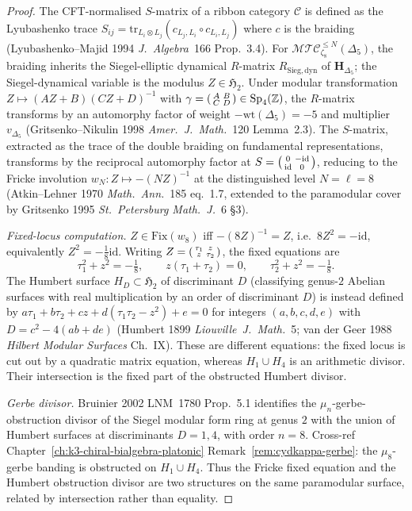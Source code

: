 \begin{proof}
The CFT-normalised $S$-matrix of a ribbon category $\mathcal C$ is
defined as the Lyubashenko trace
$S_{ij} = \mathrm{tr}_{L_i\otimes L_j}(c_{L_j,L_i}\circ c_{L_i,L_j})$
where $c$ is the braiding (Lyubashenko--Majid 1994 \emph{J.~Algebra}~166
Prop.~3.4). For \(\mathcal{MTC}_{\zeta_8}^{\leq N}(\Delta_5)\), the braiding
inherits the Siegel-elliptic dynamical $R$-matrix $R_{\mathrm{Sieg,dyn}}$
of $\mathbf H_{\Delta_5}$; the Siegel-dynamical variable is the modulus
$Z\in\mathfrak H_2$. Under modular transformation
$Z\mapsto (AZ+B)(CZ+D)^{-1}$ with $\gamma=\begin{psmallmatrix}A&B\\C&D\end{psmallmatrix}
\in\mathrm{Sp}_4(\mathbb Z)$, the $R$-matrix transforms by an
automorphy factor of weight $-\mathrm{wt}(\Delta_5) = -5$ and
multiplier $v_{\Delta_5}$
(Gritsenko--Nikulin 1998 \emph{Amer.~J.~Math.}~120 Lemma~2.3). The
$S$-matrix, extracted as the trace of the double braiding on
fundamental representations, transforms by the reciprocal automorphy
factor at $S = \begin{psmallmatrix}0&-\mathrm{id}\\\mathrm{id}&0\end{psmallmatrix}$,
reducing to the Fricke involution $w_N\colon Z\mapsto -(NZ)^{-1}$ at
the distinguished level $N = \ell = 8$
(Atkin--Lehner 1970 \emph{Math.~Ann.}~185 eq.~1.7, extended to the
paramodular cover by Gritsenko 1995 \emph{St.~Petersburg Math.~J.}~6
\S3).

\emph{Fixed-locus computation.} \(Z\in\mathrm{Fix}(w_8)\) iff
$-(8Z)^{-1} = Z$, i.e.\ $8 Z^2 = -\mathrm{id}$, equivalently
$Z^2 = -\tfrac{1}{8}\mathrm{id}$. Writing
$Z = \begin{psmallmatrix}\tau_1 & z\\ z & \tau_2\end{psmallmatrix}$,
the fixed equations are
\[
\tau_1^2+z^2=-\tfrac18,\qquad
z(\tau_1+\tau_2)=0,\qquad
\tau_2^2+z^2=-\tfrac18 .
\]
The Humbert surface \(H_D\subset\mathfrak H_2\) of discriminant \(D\)
(classifying genus-$2$ Abelian surfaces with real multiplication by an
order of discriminant \(D\)) is instead defined by
$a\tau_1 + b\tau_2 + c z + d(\tau_1\tau_2 - z^2) + e = 0$ for integers
$(a,b,c,d,e)$ with $D = c^2 - 4(ab+de)$
(Humbert 1899 \emph{Liouville~J.~Math.}~5; van der Geer 1988
\emph{Hilbert Modular Surfaces} Ch.~IX). These are different equations:
the fixed locus is cut out by a quadratic matrix equation, whereas
\(H_1\cup H_4\) is an arithmetic divisor. Their intersection is the
fixed part of the obstructed Humbert divisor.

\emph{Gerbe divisor.} Bruinier 2002 LNM~1780 Prop.~5.1 identifies
the $\mu_n$-gerbe-obstruction divisor of the Siegel modular form ring
at genus $2$ with the union of Humbert surfaces at discriminants
$D = 1, 4$, with order $n = 8$. Cross-ref
Chapter~\ref{ch:k3-chiral-bialgebra-platonic}
Remark~\ref{rem:cydkappa-gerbe}: the \(\mu_8\)-gerbe banding is
obstructed on \(H_1\cup H_4\). Thus the Fricke fixed equation and the
Humbert obstruction divisor are two structures on the same
paramodular surface, related by intersection rather than equality.
\end{proof}

